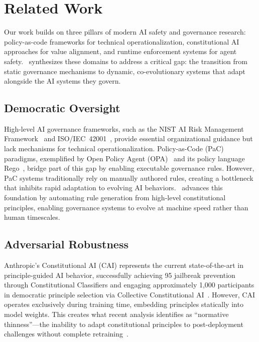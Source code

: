 \section{Related Work}\label{sec:related_work}
Our work builds on three pillars of modern AI safety and governance research: policy-as-code frameworks for technical operationalization, constitutional AI approaches for value alignment, and runtime enforcement systems for agent safety. \acgs{}\ synthesizes these domains to address a critical gap: the transition from static governance mechanisms to dynamic, co-evolutionary systems that adapt alongside the AI systems they govern.

\subsection{Democratic Oversight}
High-level AI governance frameworks, such as the NIST AI Risk Management Framework~\cite{nist2023ai} and ISO/IEC~42001~\cite{iso42001}, provide essential organizational guidance but lack mechanisms for technical operationalization. Policy-as-Code (PaC) paradigms, exemplified by Open Policy Agent (OPA)~\cite{opa2023} and its policy language Rego~\cite{rego2019}, bridge part of this gap by enabling executable governance rules. However, PaC systems traditionally rely on manually authored rules, creating a bottleneck that inhibits rapid adaptation to evolving AI behaviors. \acgs{}\ advances this foundation by automating rule generation from high-level constitutional principles, enabling governance systems to evolve at machine speed rather than human timescales.

\subsection{Adversarial Robustness}
Anthropic's Constitutional AI (CAI) represents the current state-of-the-art in principle-guided AI behavior, successfully achieving 95\percent{} jailbreak prevention through Constitutional Classifiers and engaging approximately 1,000 participants in democratic principle selection via Collective Constitutional AI~\cite{anthropic2022constitutional,anthropic2023collective}. However, CAI operates exclusively during training time, embedding principles statically into model weights. This creates what recent analysis identifies as ``normative thinness''---the inability to adapt constitutional principles to post-deployment challenges without complete retraining~\cite{digitalconstitutionalist2023}.

